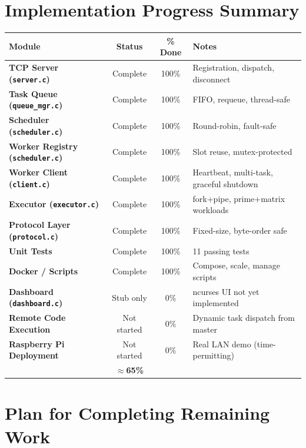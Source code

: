 \documentclass[12pt,a4paper]{article}
\begin{document}
\section{Implementation Progress Summary}

\begin{center}
\begin{tabular}{>{\bfseries}lccl}
\toprule
Module & Status & \% Done & Notes \\
\midrule
TCP Server (\texttt{server.c})         & Complete    & 100\% & Registration, dispatch, disconnect \\
Task Queue (\texttt{queue\_mgr.c})     & Complete    & 100\% & FIFO, requeue, thread-safe \\
Scheduler (\texttt{scheduler.c})       & Complete    & 100\% & Round-robin, fault-safe \\
Worker Registry (\texttt{scheduler.c}) & Complete    & 100\% & Slot reuse, mutex-protected \\
Worker Client (\texttt{client.c})      & Complete    & 100\% & Heartbeat, multi-task, graceful shutdown \\
Executor (\texttt{executor.c})         & Complete    & 100\% & fork+pipe, prime+matrix workloads \\
Protocol Layer (\texttt{protocol.c})   & Complete    & 100\% & Fixed-size, byte-order safe \\
Unit Tests                             & Complete    & 100\% & 11 passing tests \\
Docker / Scripts                       & Complete    & 100\% & Compose, scale, manage scripts \\
Dashboard (\texttt{dashboard.c})       & Stub only   & 0\%   & ncurses UI not yet implemented \\
Remote Code Execution                  & Not started & 0\%   & Dynamic task dispatch from master \\
Raspberry Pi Deployment                & Not started & 0\%   & Real LAN demo (time-permitting) \\
\midrule
\multicolumn{2}{l}{\textbf{Overall}} & \textbf{$\approx$65\%} & \\
\bottomrule
\end{tabular}
\end{center}

\section{Plan for Completing Remaining Work}
\end{document}
